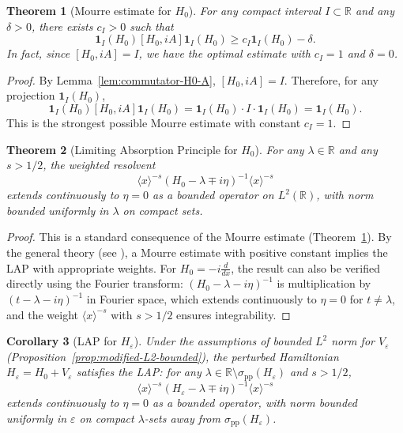 ﻿\documentclass[12pt,a4paper]{article}
\newtheorem{theorem}{Theorem}[section]
\newtheorem{corollary}[theorem]{Corollary}
\theoremstyle{definition}
\theoremstyle{remark}
\newcommand{\RR}{\mathbb{R}}
\begin{document}
\begin{theorem}[Mourre estimate for $H_0$]
\label{thm:mourre-H0}
For any compact interval $I \subset \RR$ and any $\delta > 0$, there exists $c_I > 0$ such that
\[
  \mathbf{1}_I(H_0) [H_0, iA] \mathbf{1}_I(H_0) \geq c_I \mathbf{1}_I(H_0) - \delta.
\]
In fact, since $[H_0, iA] = I$, we have the optimal estimate with $c_I = 1$ and $\delta = 0$.
\end{theorem}

\begin{proof}
By Lemma~\ref{lem:commutator-H0-A}, $[H_0, iA] = I$. Therefore, for any projection $\mathbf{1}_I(H_0)$,
\[
  \mathbf{1}_I(H_0) [H_0, iA] \mathbf{1}_I(H_0) = \mathbf{1}_I(H_0) \cdot I \cdot \mathbf{1}_I(H_0) = \mathbf{1}_I(H_0).
\]
This is the strongest possible Mourre estimate with constant $c_I = 1$.
\end{proof}

\begin{theorem}[Limiting Absorption Principle for $H_0$]
\label{thm:lap-H0}
For any $\lambda \in \RR$ and any $s > 1/2$, the weighted resolvent
\[
  \langle x \rangle^{-s} (H_0 - \lambda \mp i\eta)^{-1} \langle x \rangle^{-s}
\]
extends continuously to $\eta = 0$ as a bounded operator on $L^2(\RR)$, with norm bounded uniformly in $\lambda$ on compact sets.
\end{theorem}

\begin{proof}
This is a standard consequence of the Mourre estimate (Theorem~\ref{thm:mourre-H0}). By the general theory (see \cite[Thm.~7.2.10]{ABG}), a Mourre estimate with positive constant implies the LAP with appropriate weights. For $H_0 = -i\frac{d}{dx}$, the result can also be verified directly using the Fourier transform: $(H_0 - \lambda - i\eta)^{-1}$ is multiplication by $(t - \lambda - i\eta)^{-1}$ in Fourier space, which extends continuously to $\eta = 0$ for $t \neq \lambda$, and the weight $\langle x \rangle^{-s}$ with $s > 1/2$ ensures integrability.
\end{proof}

\begin{corollary}[LAP for $H_\varepsilon$]
\label{cor:lap-Heps}
Under the assumptions of bounded $L^2$ norm for $V_\varepsilon$ (Proposition~\ref{prop:modified-L2-bounded}), the perturbed Hamiltonian $H_\varepsilon = H_0 + V_\varepsilon$ satisfies the LAP: for any $\lambda \in \RR \setminus \sigma_{\mathrm{pp}}(H_\varepsilon)$ and $s > 1/2$,
\[
  \langle x \rangle^{-s} (H_\varepsilon - \lambda \mp i\eta)^{-1} \langle x \rangle^{-s}
\]
extends continuously to $\eta = 0$ as a bounded operator, with norm bounded uniformly in $\varepsilon$ on compact $\lambda$-sets away from $\sigma_{\mathrm{pp}}(H_\varepsilon)$.
\end{corollary}
\end{document}
